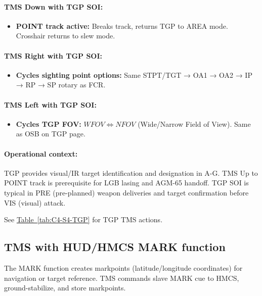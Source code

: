 \documentclass[11pt, a4paper, twoside]{report}
\newcommand{\tabref}[1]{\hyperref[#1]{Table~\ref*{#1}}}
\begin{document}
\paragraph{TMS Down with TGP SOI:}
\begin{itemize}
    \item \textbf{POINT track active:} Breaks track, returns TGP to AREA mode. Crosshair returns to slew mode.
\end{itemize}

\paragraph{TMS Right with TGP SOI:}
\begin{itemize}
    \item \textbf{Cycles sighting point options:} Same STPT/TGT → OA1 → OA2 → IP → RP → SP rotary as FCR.
\end{itemize}

\paragraph{TMS Left with TGP SOI:}
\begin{itemize}
    \item \textbf{Cycles TGP FOV:} $WFOV \iff NFOV$ (Wide/Narrow Field of View). Same as OSB on TGP page.
\end{itemize}

\paragraph{Operational context:}
TGP provides visual/IR target identification and designation in A-G. TMS Up to POINT track is prerequisite for LGB lasing and AGM-65 handoff. TGP SOI is typical in PRE (pre-planned) weapon deliveries and target confirmation before VIS (visual) attack.

See \tabref{tab:C4-S4-TGP} for TGP TMS actions.

\subsection{TMS with HUD/HMCS MARK function}
\label{sec:C4-S4-S3}

The MARK function creates markpoints (latitude/longitude coordinates) for navigation or target reference. TMS commands slave MARK cue to HMCS, ground-stabilize, and store markpoints.
\end{document}
